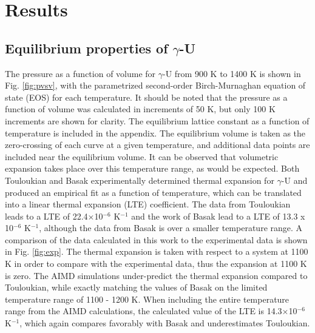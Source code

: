 \documentclass[review]{elsarticle}
\begin{document}
\section{Results}
\subsection{Equilibrium properties of $\gamma$-U}

The pressure as a function of volume for $\gamma$-U from 900 K to 1400 K is shown in Fig. \ref{fig:pvsv}, with the parametrized second-order Birch-Murnaghan equation of state (EOS) for each temperature. It should be noted that the pressure as a function of volume was calculated in increments of 50 K, but only 100 K increments are shown for clarity. The equilibrium lattice constant as a function of temperature is included in the appendix. The equilibrium volume is taken as the zero-crossing of each curve at a given temperature, and additional data points are included near the equilibrium volume. It can be observed that volumetric expansion takes place over this temperature range, as would be expected. Both Touloukian \cite{touloukian} and Basak \cite{basak} experimentally determined thermal expansion for $\gamma$-U and produced an empirical fit as a function of temperature, which can be translated into a linear thermal expansion (LTE) coefficient. The data from Touloukian leads to a LTE of 22.4$\times$10$^{-6}$ K$^{-1}$ and the work of Basak lead to a LTE of 13.3 x 10$^{-6}$ K$^{-1}$, although the data from Basak is over a smaller temperature range. A comparison of the data calculated in this work to the experimental data is shown in Fig. \ref{fig:exp}. The thermal expansion is taken with respect to a system at 1100 K in order to compare with the experimental data, thus the expansion at 1100 K is zero. The AIMD simulations under-predict the thermal expansion compared to Touloukian, while exactly matching the values of Basak on the limited temperature range of 1100 - 1200 K. When including the entire temperature range from the AIMD calculations, the calculated value of the LTE is 14.3$\times$10$^{-6}$ K$^{-1}$, which again compares favorably with Basak and underestimates Touloukian.
\end{document}
